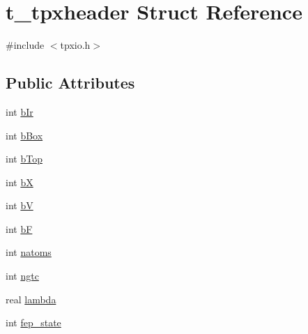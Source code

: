 \hypertarget{structt__tpxheader}{\section{t\-\_\-tpxheader \-Struct \-Reference}
\label{structt__tpxheader}
}


{\ttfamily \#include $<$tpxio.\-h$>$}

\subsection*{\-Public \-Attributes}
\begin{DoxyCompactItemize}
\item 
int \hyperlink{structt__tpxheader_a527d46b829c8ee26fc876a5f547bddfb}{b\-Ir}
\item 
int \hyperlink{structt__tpxheader_aaa3c5d59fb5f7fcf10c2ddb73e60d3e8}{b\-Box}
\item 
int \hyperlink{structt__tpxheader_a6e1b1dff6090e7473152d90acb23eb34}{b\-Top}
\item 
int \hyperlink{structt__tpxheader_a343cd0fdce2e2d0a00006ba8cbfca1da}{b\-X}
\item 
int \hyperlink{structt__tpxheader_a44927f6e2a578ed397be9672fd33d3c0}{b\-V}
\item 
int \hyperlink{structt__tpxheader_a4a98dcdc61c2f565d039322a1ad54b01}{b\-F}
\item 
int \hyperlink{structt__tpxheader_ad977f3bcb0c86767a10efd8f894269a8}{natoms}
\item 
int \hyperlink{structt__tpxheader_aec5a7ac970999ea1ab89617f0844788a}{ngtc}
\item 
real \hyperlink{structt__tpxheader_a5f70a59140b3a5babce179de078d59d2}{lambda}
\item 
int \hyperlink{structt__tpxheader_a737887f98f31a91a75bad3791a1c0fb3}{fep\-\_\-state}
\end{DoxyCompactItemize}


